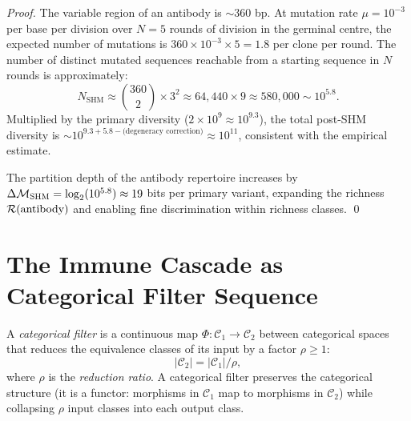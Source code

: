 \begin{proof}
The variable region of an antibody is $\sim 360$ bp. At mutation rate
$\mu = 10^{-3}$ per base per division over $N = 5$ rounds of division in
the germinal centre, the expected number of mutations is
$360 \times 10^{-3} \times 5 = 1.8$ per clone per round. The number of
distinct mutated sequences reachable from a starting sequence in $N$ rounds
is approximately:
\begin{equation}
  N_{\mathrm{SHM}} \approx \binom{360}{2} \times 3^2 \approx 64{,}440 \times 9 \approx 580{,}000 \sim 10^{5.8}.
\end{equation}
Multiplied by the primary diversity ($2 \times 10^9 \approx 10^{9.3}$),
the total post-SHM diversity is $\sim 10^{9.3 + 5.8 - \text{(degeneracy correction)}}
\approx 10^{11}$, consistent with the empirical estimate.

The partition depth of the antibody repertoire increases by
$\Delta\mathcal{M}_{\mathrm{SHM}} = \log_2(10^{5.8}) \approx 19$ bits per primary
variant, expanding the richness $\mathcal{R}(\text{antibody})$ and enabling fine
discrimination within richness classes. \qed
\end{proof}

\section{The Immune Cascade as Categorical Filter Sequence}
\label{sec:immune_cascade}

\begin{definition}
\label{def:cat_filter}
A \emph{categorical filter} is a continuous map $\Phi: \mathcal{C}_1 \to \mathcal{C}_2$
between categorical spaces that reduces the equivalence classes of its input
by a factor $\rho \geq 1$:
\begin{equation}
  |\mathcal{C}_2| = |\mathcal{C}_1| / \rho,
\end{equation}
where $\rho$ is the \emph{reduction ratio}. A categorical filter preserves
the categorical structure (it is a functor: morphisms in $\mathcal{C}_1$ map
to morphisms in $\mathcal{C}_2$) while collapsing $\rho$ input classes
into each output class.
\end{definition}

